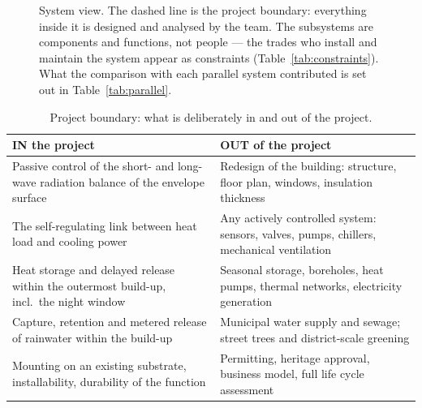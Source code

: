 \begin{figure}[htbp]
{}
\caption{System view. The dashed line is the project boundary: everything inside
it is designed and analysed by the team. The subsystems are components and
functions, not people --- the trades who install and maintain the system appear
as constraints (Table~\ref{tab:constraints}). What the comparison with each
parallel system contributed is set out in Table~\ref{tab:parallel}.}
\label{fig:systemview}
\end{figure}

\begin{table}[htbp]
\centering
\caption{Project boundary: what is deliberately in and out of the project.}
\label{tab:inout}
\renewcommand{\arraystretch}{1.15}
\small
\begin{tabularx}{\textwidth}{X X}
\toprule
\textbf{IN the project} & \textbf{OUT of the project} \\
\midrule
Passive control of the short- and long-wave radiation balance of the envelope
surface
& Redesign of the building: structure, floor plan, windows, insulation
thickness \\
The self-regulating link between heat load and cooling power
& Any actively controlled system: sensors, valves, pumps, chillers, mechanical
ventilation \\
Heat storage and delayed release within the outermost build-up, incl.\ the night
window
& Seasonal storage, boreholes, heat pumps, thermal networks, electricity
generation \\
Capture, retention and metered release of rainwater within the build-up
& Municipal water supply and sewage; street trees and district-scale greening \\
Mounting on an existing substrate, installability, durability of the function
& Permitting, heritage approval, business model, full life cycle assessment \\
\bottomrule
\end{tabularx}
\end{table}

